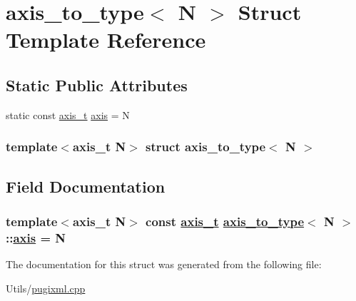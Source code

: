\hypertarget{structaxis__to__type}{
\section{axis\_\-to\_\-type$<$ N $>$ Struct Template Reference}
\label{structaxis__to__type}
}
\subsection*{Static Public Attributes}
\begin{CompactItemize}
\item 
static const \hyperlink{pugixml_8cpp_e7747145441b0591a5c04f20f6f9189a}{axis\_\-t} \hyperlink{structaxis__to__type_c9d75681918ad98c980db0f49b570b50}{axis} = N
\end{CompactItemize}
\subsubsection*{template$<$axis\_\-t N$>$ struct axis\_\-to\_\-type$<$ N $>$}



\subsection{Field Documentation}
\hypertarget{structaxis__to__type_c9d75681918ad98c980db0f49b570b50}{
\subsubsection[axis]{\setlength{\rightskip}{0pt plus 5cm}template$<$axis\_\-t N$>$ const \hyperlink{pugixml_8cpp_e7747145441b0591a5c04f20f6f9189a}{axis\_\-t} \hyperlink{structaxis__to__type}{axis\_\-to\_\-type}$<$ N $>$::\hyperlink{structaxis__to__type_c9d75681918ad98c980db0f49b570b50}{axis} = N}}
\label{structaxis__to__type_c9d75681918ad98c980db0f49b570b50}




The documentation for this struct was generated from the following file:\begin{CompactItemize}
\item 
Utils/\hyperlink{pugixml_8cpp}{pugixml.cpp}\end{CompactItemize}
